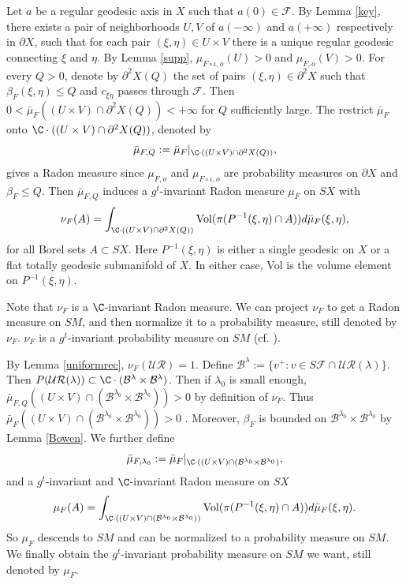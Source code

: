 \documentclass[11pt]{amsart}
\theoremstyle{definition}
\newcommand{\BBB}{\mathcal{B}}
\def\p{{\partial}}
\newcommand{\F}{\mathcal{F}}
\newcommand{\UR}{\mathcal{UR}}
\def\pX{{\partial X}}
\def\b{\beta}
\def\l{\lambda}   \def\L{\Lambda}
\begin{document}
Let $a$ be a regular geodesic axis in $X$ such that $a(0)\in \F$. By Lemma \ref{key}, there exists a pair of neighborhoods $U,V$ of $a(-\infty)$ and $a(+\infty)$ respectively in $\pX$, such that for each pair $(\xi,\eta)\in U \times V$ there is a unique regular geodesic connecting $\xi$ and $\eta$. 
By Lemma \ref{supp}, $\mu_{F\circ \iota,o}(U)>0$ and  $\mu_{F,o}(V)>0$.
For every $Q>0$, denote by $\p^2X(Q)$ the set of pairs $(\xi,\eta)\in \p^2X$ such that $\b_F(\xi,\eta)\le Q$ and $c_{\xi\eta}$ passes through $\F$. 
Then $0<\bar\mu_F((U\times V)\cap \p^2X(Q))<+\infty$ for $Q$ sufficiently large. The restrict $\bar\mu_F$ onto $\C\cdot((U\times V)\cap \p^2X(Q))$, denoted by
$$\bar\mu_{F,Q}:=\bar\mu_F|_{\C\cdot((U\times V)\cap \p^2X(Q))},$$
gives a Radon measure since $\mu_{F,o}$ and $\mu_{F\circ \iota,o}$ are probability measures on $\pX$ and $\b_F\le Q$. 
Then $\bar\mu_{F,Q}$ induces a $g^t$-invariant Radon measure $\mu_{F}$ on $SX$ with
\begin{equation*}
\nu_{F}(A)=\int_{\C\cdot((U\times V)\cap \p^2X(Q))} \text{Vol}(\pi(P^{-1}(\xi,\eta)\cap A))d  \bar \mu_{F}(\xi,\eta),
\end{equation*}
for all Borel sets $A\subset SX$. Here  $P^{-1}(\xi,\eta)$ is either a single geodesic on $X$ or a flat totally geodesic submanifold of $X$. In either case, Vol is the volume element on  $P^{-1}(\xi,\eta)$.

Note that $\nu_F$ is a $\C$-invariant Radon measure. We can project $\nu_{F}$ to get a Radon measure on $SM$, and then normalize it to a probability measure, still denoted by $\nu_{F}$. $\nu_F$ is a $g^t$-invariant probability measure on $SM$ (cf. \cite[Theorem 2.1]{Kai}).

By Lemma \ref{uniformrec}, $\nu_F(\UR)=1$. Define $\BBB^\l:=\{v^+: v\in S\F\cap \UR(\l)\}$. Then $P(\UR(\l))\subset \C\cdot (\BBB^\l\times \BBB^\l)$. Then if $\l_0$ is small enough, $\bar\mu_{F,Q}((U\times V)\cap (\BBB^{\l_0}\times \BBB^{\l_0}))>0$ by definition of $\nu_F$. Thus $\bar\mu_F((U\times V)\cap (\BBB^{\l_0}\times \BBB^{\l_0}))>0$ . Moreover, $\b_F$ is bounded on $\BBB^{\l_0}\times \BBB^{\l_0}$ by Lemma \ref{Bowen}. We further define
$$\bar\mu_{F,\l_0}:=\bar\mu_F|_{\C\cdot((U\times V)\cap (\BBB^{\l_0}\times \BBB^{\l_0})},$$
and a $g^t$-invariant and $\C$-invariant Radon measure on $SX$
\begin{equation*}
\mu_{F}(A)=\int_{\C\cdot((U\times V)\cap (\BBB^{\l_0}\times \BBB^{\l_0}))} \text{Vol}(\pi(P^{-1}(\xi,\eta)\cap A))d  \bar \mu_{F}(\xi,\eta).
\end{equation*}
So $\mu_{F}$ descends to $SM$ and can be normalized to a probability measure on $SM$. We finally obtain the $g^t$-invariant probability measure on $SM$ we want, still denoted by $\mu_F$.
\end{document}
